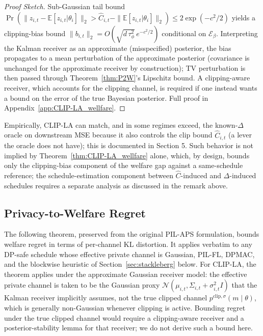 \documentclass{article}
\begin{document}
\begin{proof}
    [Proof Sketch]
    Sub-Gaussian tail bound $\Pr(\|z_{i,t} - \mathbb{E}[z_{i,t}|\theta_i]\|_2 > \hat C_{i,t} - \|\mathbb{E}[z_{i,t}|\theta_i]\|_2) \le 2\exp(-c^2/2)$ yields a clipping-bias bound $\|b_{i,t}\|_2 = O(\sqrt{d\,\tau_\phi^2}\, e^{-c^2/2})$ conditional on $\mathcal{E}_\beta$. Interpreting the Kalman receiver as an approximate (misspecified) posterior, the bias propagates to a mean perturbation of the approximate posterior (covariance is unchanged for the approximate receiver by construction); TV perturbation is then passed through Theorem~\ref{thm:P2W}'s Lipschitz bound. A clipping-aware receiver, which accounts for the clipping channel, is required if one instead wants a bound on the error of the true Bayesian posterior. Full proof in Appendix~\ref{app:CLIP-LA_wellfare}. 
\end{proof}

Empirically, CLIP-LA can match, and in some regimes exceed, the known-$\Delta$ oracle on downstream MSE because it also controls the clip bound $\hat C_{i,t}$ (a lever the oracle does not have); this is documented in Section 5. Such behavior is not implied by Theorem~\ref{thm:CLIP-LA_wellfare} alone, which, by design, bounds only the clipping-bias component of the welfare gap against a same-schedule reference; the schedule-estimation component between $\hat C$-induced and $\Delta$-induced schedules requires a separate analysis as discussed in the remark above.

\subsection{Privacy-to-Welfare Regret}
\label{sec:regret}
The following theorem, preserved from the original PIL-APS formulation, bounds welfare regret in terms of per-channel KL distortion. It applies verbatim to any DP-safe schedule whose effective private channel is Gaussian, PIL-FL, DPMAC, and the blockwise heuristic of Section~\ref{sec:stackleberg} below. For CLIP-LA, the theorem applies under the approximate Gaussian receiver model: the effective private channel is taken to be the Gaussian proxy $\mathcal{N}(\mu_{i,t}, \Sigma_{i,t} + \sigma_{i,t}^2 I)$ that the Kalman receiver implicitly assumes, not the true clipped channel $p^{\mathrm{clip},\sigma}(m \mid \theta)$, which is generally non-Gaussian whenever clipping is active. Bounding regret under the true clipped channel would require a clipping-aware receiver and a posterior-stability lemma for that receiver; we do not derive such a bound here.
\end{document}
